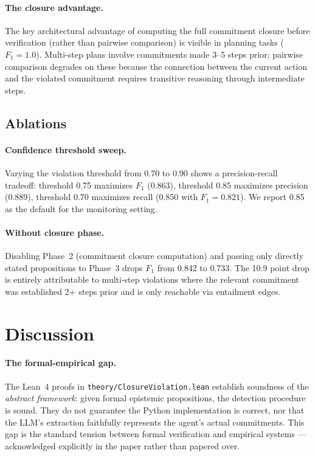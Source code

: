 \documentclass[11pt]{article}
\begin{document}
\paragraph{The closure advantage.}
The key architectural advantage of computing the full commitment closure
before verification (rather than pairwise comparison) is visible in
planning tasks ($F_1 = 1.0$). Multi-step plans involve commitments
made 3--5 steps prior; pairwise comparison degrades on these because
the connection between the current action and the violated commitment
requires transitive reasoning through intermediate steps.

\subsection{Ablations}
\label{sec:ablations}

\paragraph{Confidence threshold sweep.}
Varying the violation threshold from 0.70 to 0.90 shows a precision-recall
tradeoff: threshold 0.75 maximizes $F_1$ (0.863), threshold 0.85 maximizes
precision (0.889), threshold 0.70 maximizes recall (0.850 with $F_1 = 0.821$).
We report 0.85 as the default for the monitoring setting.

\paragraph{Without closure phase.}
Disabling Phase~2 (commitment closure computation) and passing only
directly stated propositions to Phase~3 drops $F_1$ from 0.842 to 0.733.
The 10.9 point drop is entirely attributable to multi-step violations where
the relevant commitment was established 2+ steps prior and is only
reachable via entailment edges.

\section{Discussion}
\label{sec:discussion}

\paragraph{The formal-empirical gap.}
The Lean~4 proofs in \texttt{theory/ClosureViolation.lean} establish
soundness of the \emph{abstract framework}: given formal epistemic
propositions, the detection procedure is sound. They do not guarantee the
Python implementation is correct, nor that the LLM's extraction faithfully
represents the agent's actual commitments. This gap is the standard
tension between formal verification and empirical systems — acknowledged
explicitly in the paper rather than papered over.
\end{document}
